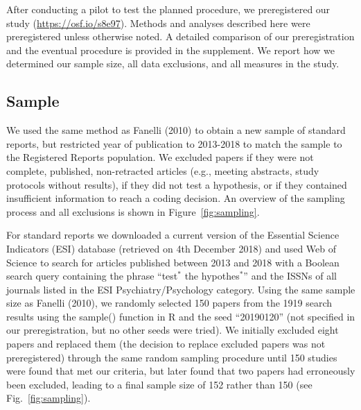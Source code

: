 \documentclass[british,,jou,floatsintext]{apa6}
\begin{document}
After conducting a pilot to test the planned procedure, we preregistered our study (\url{https://osf.io/s8e97}).
Methods and analyses described here were preregistered unless otherwise noted.
A detailed comparison of our preregistration and the eventual procedure is provided in the supplement.
We report how we determined our sample size, all data exclusions, and all measures in the study.

\hypertarget{sample}{%
\subsection{Sample}\label{sample}}

We used the same method as Fanelli (2010) to obtain a new sample of standard reports, but restricted year of publication to 2013-2018 to match the sample to the Registered Reports population.
We excluded papers if they were not complete, published, non-retracted articles (e.g., meeting abstracts, study protocols without results), if they did not test a hypothesis, or if they contained insufficient information to reach a coding decision.
An overview of the sampling process and all exclusions is shown in Figure~\ref{fig:sampling}.

For standard reports we downloaded a current version of the Essential Science Indicators (ESI) database (retrieved on 4th December 2018) and used Web of Science to search for articles published between 2013 and 2018 with a Boolean search query containing the phrase \enquote{test\(^\ast\) the hypothes\(^\ast\)} and the ISSNs of all journals listed in the ESI Psychiatry/Psychology category.
Using the same sample size as Fanelli (2010), we randomly selected 150 papers from the 1919 search results using the sample() function in R and the seed \enquote{20190120} (not specified in our preregistration, but no other seeds were tried).
We initially excluded eight papers and replaced them (the decision to replace excluded papers was not preregistered) through the same random sampling procedure until 150 studies were found that met our criteria, but later found that two papers had erroneously been excluded, leading to a final sample size of 152 rather than 150 (see Fig.~\ref{fig:sampling}).
\end{document}
